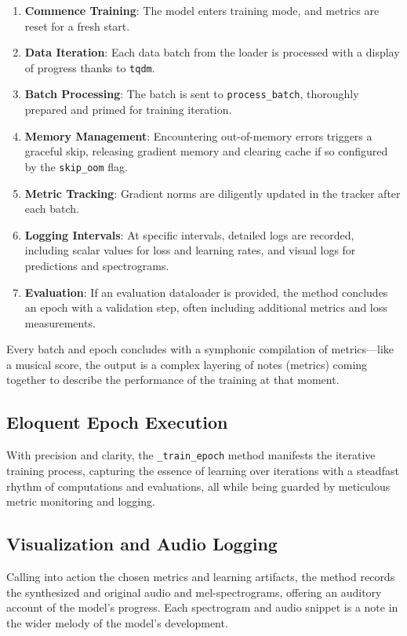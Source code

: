 \documentclass[a4paper]{article}
\begin{document}
\begin{enumerate}
  \item \textbf{Commence Training}: The model enters training mode, and metrics are reset for a fresh start.
  \item \textbf{Data Iteration}: Each data batch from the loader is processed with a display of progress thanks to \texttt{tqdm}.
  \item \textbf{Batch Processing}: The batch is sent to \texttt{process\_batch}, thoroughly prepared and primed for training iteration.
  \item \textbf{Memory Management}: Encountering out-of-memory errors triggers a graceful skip, releasing gradient memory and clearing cache if so configured by the \texttt{skip\_oom} flag.
  \item \textbf{Metric Tracking}: Gradient norms are diligently updated in the tracker after each batch.
  \item \textbf{Logging Intervals}: At specific intervals, detailed logs are recorded, including scalar values for loss and learning rates, and visual logs for predictions and spectrograms.
  \item \textbf{Evaluation}: If an evaluation dataloader is provided, the method concludes an epoch with a validation step, often including additional metrics and loss measurements. 
\end{enumerate}

Every batch and epoch concludes with a symphonic compilation of metrics—like a musical score, the output is a complex layering of notes (metrics) coming together to describe the performance of the training at that moment.


\subsection{Eloquent Epoch Execution}

With precision and clarity, the \texttt{\_train\_epoch} method manifests the iterative training process, capturing the essence of learning over iterations with a steadfast rhythm of computations and evaluations, all while being guarded by meticulous metric monitoring and logging.

\subsection{Visualization and Audio Logging}

Calling into action the chosen metrics and learning artifacts, the method records the synthesized and original audio and mel-spectrograms, offering an auditory account of the model’s progress. Each spectrogram and audio snippet is a note in the wider melody of the model's development.
\end{document}
